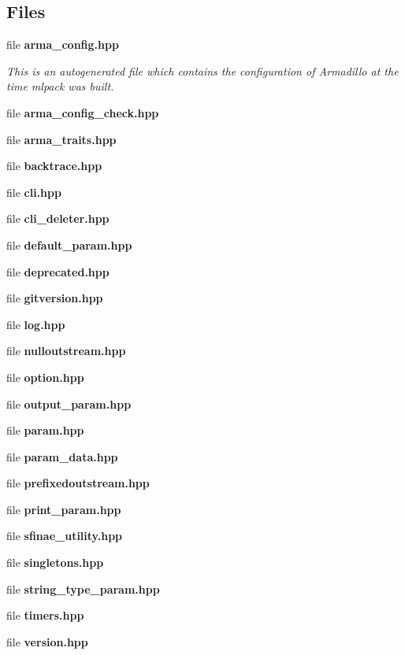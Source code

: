 \subsection*{Files}
\begin{DoxyCompactItemize}
\item 
file {\bf arma\+\_\+config.\+hpp}
\begin{DoxyCompactList}\small\item\em This is an autogenerated file which contains the configuration of Armadillo at the time mlpack was built. \end{DoxyCompactList}\item 
file {\bf arma\+\_\+config\+\_\+check.\+hpp}
\item 
file {\bf arma\+\_\+traits.\+hpp}
\item 
file {\bf backtrace.\+hpp}
\item 
file {\bf cli.\+hpp}
\item 
file {\bf cli\+\_\+deleter.\+hpp}
\item 
file {\bf default\+\_\+param.\+hpp}
\item 
file {\bf deprecated.\+hpp}
\item 
file {\bf gitversion.\+hpp}
\item 
file {\bf log.\+hpp}
\item 
file {\bf nulloutstream.\+hpp}
\item 
file {\bf option.\+hpp}
\item 
file {\bf output\+\_\+param.\+hpp}
\item 
file {\bf param.\+hpp}
\item 
file {\bf param\+\_\+data.\+hpp}
\item 
file {\bf prefixedoutstream.\+hpp}
\item 
file {\bf print\+\_\+param.\+hpp}
\item 
file {\bf sfinae\+\_\+utility.\+hpp}
\item 
file {\bf singletons.\+hpp}
\item 
file {\bf string\+\_\+type\+\_\+param.\+hpp}
\item 
file {\bf timers.\+hpp}
\item 
file {\bf version.\+hpp}
\end{DoxyCompactItemize}
